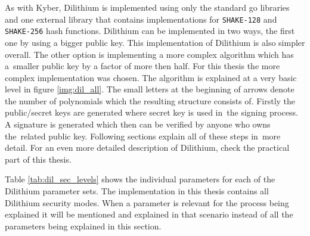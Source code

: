 As with Kyber, Dilithium is implemented using only the standard go libraries and one external library \cite{00fV2cvg7Z6H2tS3} that contains implementations for \texttt{SHAKE-128} and \texttt{SHAKE-256} hash functions. Dilithium can be implemented in two ways, the first one by using a bigger public key. This implementation of Dilithium is also simpler overall. The other option is implementing a more complex algorithm which has a~smaller public key by a factor of more then half. For this thesis the more complex implementation was chosen. The algorithm is explained at a very basic level in figure \ref{img:dil_all}. The small letters at the beginning of arrows denote the number of polynomials which the resulting structure consists of. Firstly the public/secret keys are generated where secret key is used in~the signing process. A signature is generated which then can be verified by anyone who owns the~related public key. Following sections explain all of these steps in~more detail. For an even more detailed description of Dilithium, check the practical part of this thesis.


Table \ref{tab:dil_sec_levels} shows the individual parameters for each of the Dilithium parameter sets. The implementation in this thesis contains all Dilithium security modes. When a parameter is relevant for the process being explained it will be mentioned and explained in that scenario instead of all the parameters being explained in this section.
